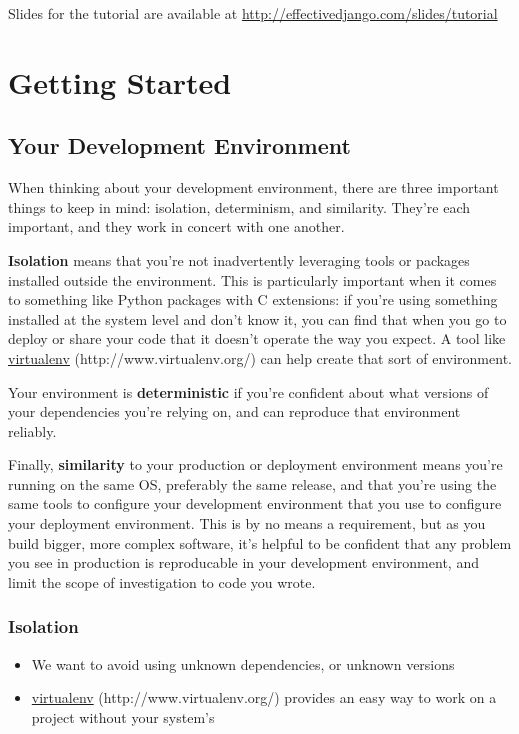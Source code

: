 \documentclass[letterpaper,10pt,english]{sphinxmanual}
\begin{document}
Slides for the tutorial are available at \href{http://effectivedjango.com/slides/tutorial}{http://effectivedjango.com/slides/tutorial}

\chapter{Getting Started}
\label{tutorial/getting-started:getting-started}\label{tutorial/getting-started::doc}\label{tutorial/getting-started:effective-django-tutorial}

\section{Your Development Environment}
\label{tutorial/getting-started:your-development-environment}
When thinking about your development environment, there are three
important things to keep in mind: isolation, determinism, and
similarity. They're each important, and they work in concert with one
another.

\textbf{Isolation} means that you're not inadvertently leveraging tools
or packages installed outside the environment. This is particularly
important when it comes to something like Python packages with C
extensions: if you're using something installed at the system level
and don't know it, you can find that when you go to deploy or share
your code that it doesn't operate the way you expect. A tool like
\href{http://www.virtualenv.org/}{virtualenv} (http://www.virtualenv.org/) can help create that sort of environment.

Your environment is \textbf{deterministic} if you're confident about
what versions of your dependencies you're relying on, and can
reproduce that environment reliably.

Finally, \textbf{similarity} to your production or deployment
environment means you're running on the same OS, preferably the
same release, and that you're using the same tools to configure
your development environment that you use to configure your
deployment environment. This is by no means a requirement, but as
you build bigger, more complex software, it's helpful to be
confident that any problem you see in production is reproducable in
your development environment, and limit the scope of investigation
to code you wrote.


\subsection{Isolation}
\label{tutorial/getting-started:virtualenv}\label{tutorial/getting-started:isolation}\begin{itemize}
\item {} 
We want to avoid using unknown dependencies, or unknown versions

\item {} 
\href{http://www.virtualenv.org/}{virtualenv} (http://www.virtualenv.org/) provides an easy way to work on a project without your
system's 

\end{itemize}
\end{document}
